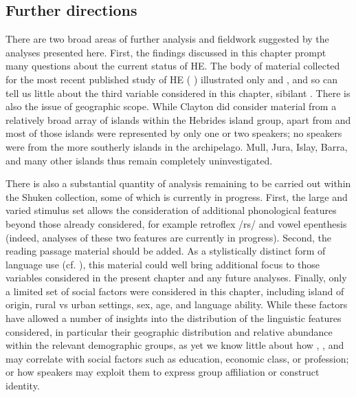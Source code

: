\documentclass[output=paper,colorlinks,citecolor=brown]{langscibook}
\begin{document}
\subsection{Further directions}

There are two broad areas of further analysis and fieldwork suggested by the analyses presented here. First, the findings discussed in this chapter prompt many questions about the current status of HE. The body of material collected for the most recent published study of HE (\citeauthor{Clayton:2015} \citeyear{Clayton:2015, Clayton:2017, Clayton:2018}) illustrated only  and , and so can tell us little about the third variable considered in this chapter, sibilant . There is also the issue of geographic scope. While Clayton did consider material from a relatively broad array of islands within the Hebrides island group, apart from  and  most of those islands were represented by only one or two speakers; no speakers were from the more southerly islands in the archipelago. Mull, Jura, Islay, Barra, and many other islands thus remain completely uninvestigated. 

There is also a substantial quantity of analysis remaining to be carried out within the Shuken collection, some of which is currently in progress. First, the large and varied stimulus set allows the consideration of additional phonological features beyond those already considered, for example retroflex /rs/ and vowel epenthesis (indeed, analyses of these two features are currently in progress). Second, the reading passage material should be added. As a stylistically distinct form of language use (cf. \citealt{Trudgill:1972}), this material could well bring additional focus to those variables considered in the present chapter and any future analyses. Finally, only a limited set of social factors were considered in this chapter, including island of origin, rural vs urban settings, sex, age, and language ability. While these factors have allowed a number of insights into the distribution of the linguistic features considered, in particular their geographic distribution and relative abundance within the relevant demographic groups, as yet we know little about how , , and  may correlate with social factors such as education, economic class, or profession; or how speakers may exploit them to express group affiliation or construct identity. 

\end{document}
